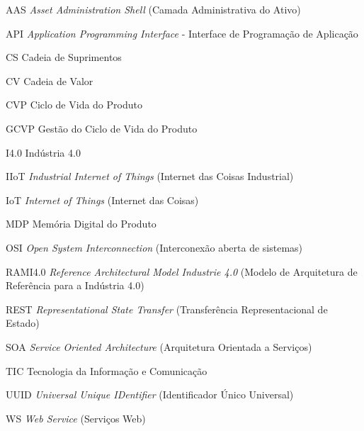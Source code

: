 \listoffigures*
\cleardoublepage



\listoftables*
\cleardoublepage

\begin{siglas}
	\item[AAS] \textit{Asset Administration Shell} (Camada Administrativa do Ativo)
	\item[API] \textit{Application Programming Interface} - Interface de Programação de Aplicação
	\item[CS] Cadeia de Suprimentos
	\item[CV] Cadeia de Valor
	\item[CVP] Ciclo de Vida do Produto
	\item[GCVP] Gestão do Ciclo de Vida do Produto
	\item[I4.0] Indústria 4.0
	\item[IIoT] \textit{Industrial Internet of Things} (Internet das Coisas Industrial)
	\item[IoT] \textit{Internet of Things} (Internet das Coisas)
	\item[MDP] Memória Digital do Produto
	\item[OSI] \textit{Open System Interconnection} (Interconexão aberta de sistemas)
	\item[RAMI4.0] \textit{Reference Architectural Model Industrie 4.0} (Modelo de Arquitetura de Referência para a Indústria 4.0)
	\item[REST] \textit{Representational State Transfer} (Transferência Representacional de Estado)
	\item[SOA] \textit{Service Oriented Architecture} (Arquitetura Orientada a Serviços)
  	\item[TIC] Tecnologia da Informação e Comunicação
  	\item[UUID] \textit{Universal Unique IDentifier} (Identificador Único Universal)
  	\item[WS] \textit{Web Service} (Serviços Web)
  	
  	
  	
\end{siglas}


\tableofcontents*
\cleardoublepage